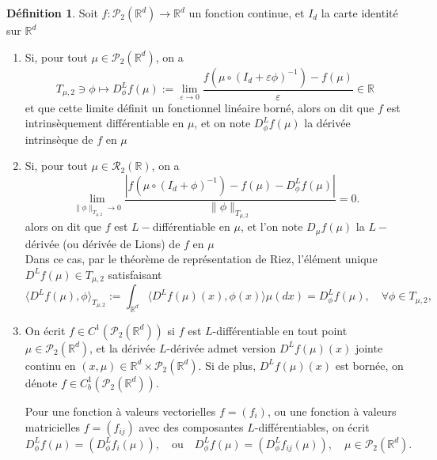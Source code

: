 \documentclass[12pt,a4paper,twoside]{book}%
\theoremstyle{definition}
\newtheorem{dfn}{Définition}[section]
\numberwithin{equation}{section}
\begin{document}
\begin{dfn}
	Soit $f:\mathcal{P}_2(\mathbb{R}^d)\longrightarrow\mathbb{R}^d$ un fonction continue, et $I_d$ la carte identité sur $\mathbb{R}^d$
	
	\begin{enumerate}
		\item Si, pour tout $\mu\in\mathcal{P}_2(\mathbb{R}^d)$, on a
		\[
		T_{\mu,2}\ni\phi \mapsto D^L_{\phi}f(\mu):=\lim_{\varepsilon\to 0}\frac{f(\mu\circ(I_d+\varepsilon\phi)^{-1})-f(\mu)}{\varepsilon}\in\mathbb{R}
		\]
		et que cette limite définit un fonctionnel linéaire borné, alors on dit que $f$ est intrinsèquement différentiable en $\mu$, et on note $D^L_{\phi}f(\mu)$ la dérivée intrinsèque de $f$ en $\mu$
		
		\item Si, pour tout $\mu\in\mathcal{R}_2(\mathbb{R})$, on a
		\[
		\lim_{\|\phi\|_{T_{\mu,2}} \to 0} \frac{|f(\mu \circ (I_d + \phi)^{-1}) - f(\mu) - D^L_\phi f(\mu)|}{\|\phi\|_{T_{\mu,2}}} = 0.
		\]
		alors on dit que $f$ est $L-$différentiable en $\mu$, et l'on note $D_\mu f(\mu)$ la $L-$dérivée (ou dérivée de Lions) de $f$ en $\mu$
		\\ Dans ce cas, par le théorème de représentation de Riez, l'élément unique $D^Lf(\mu)\in T_{\mu,2}$ satisfaisant
		\[
		\langle D^L f(\mu), \phi \rangle_{T_{\mu,2}} := \int_{\mathbb{R}^d} \langle D^L f(\mu)(x), \phi(x) \rangle \mu(dx) = D^L_\phi f(\mu), \quad \forall \phi \in T_{\mu,2},
		\]
		\item  On écrit \( f \in C^1(\mathcal{P}_2(\mathbb{R}^d)) \) si \( f \) est \( L \)-différentiable en tout point \( \mu \in \mathcal{P}_2(\mathbb{R}^d) \), et la dérivée \( L \)-dérivée admet version \( D^L f(\mu)(x) \) jointe continu en \( (x, \mu) \in \mathbb{R}^d \times \mathcal{P}_2(\mathbb{R}^d) \). Si de plus, \( D^L f(\mu)(x) \) est bornée, on dénote \( f \in C_b^1(\mathcal{P}_2(\mathbb{R}^d)) \).
		
		Pour une fonction à valeurs vectorielles $f = (f_i)$, ou une fonction à valeurs matricielles $f = (f_{ij})$ avec des composantes $L$-différentiables, on écrit
		\[
		D^L_\phi f(\mu) = (D^L_\phi f_i(\mu)), \quad \text{ou} \quad D^L_\phi f(\mu) = (D^L_\phi f_{ij}(\mu)), \quad \mu \in \mathcal{P}_2(\mathbb{R}^d).
		\] 
	\end{enumerate}
\end{dfn}
\end{document}
